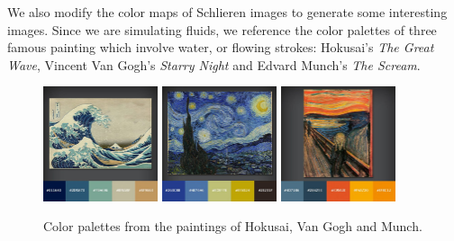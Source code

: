 \documentclass[11pt]{article} %
\begin{document}
We also modify the color maps of Schlieren images to generate some interesting images. Since we are simulating fluids, we reference the color palettes of three famous painting which involve water, or flowing strokes: Hokusai's \textit{The Great Wave}, Vincent Van Gogh's \textit{Starry Night} and Edvard Munch's \textit{The Scream}.
\begin{figure}[h!]
\centering
\includegraphics[width=0.3\textwidth]{hokusai.jpg}
\includegraphics[width=0.3\textwidth]{vangogh.jpg}
\includegraphics[width=0.3\textwidth]{munch.jpg}
\caption{Color palettes from the paintings of Hokusai, Van Gogh and Munch.}
\end{figure}
\end{document}
